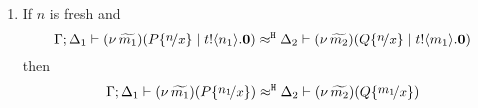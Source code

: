 \begin{lemma}
\begin{enumerate}
		\item
			If $n$ is fresh and
			\[
				\horel{\Gamma}{\Delta_1}{ \newsp{\widetilde{m_1}}{P \subst{n}{x} \Par \bout{t}{n_1} \inact }}
				{\hwb}
				{\Delta_2}{ \newsp{\widetilde{m_2}}{Q \subst{n}{x} \Par \bout{t}{m_1} \inact }}
			\]
			then
			\[
				\horel{\Gamma}{\Delta_1}{ \newsp{\widetilde{m_1}}{P \subst{n_1}{x} }}
				{\hwb}
				{\Delta_2}{ \newsp{\widetilde{m_2}}{Q \subst{m_1}{x} }}
			\]

	\end{enumerate}
\end{lemma}

